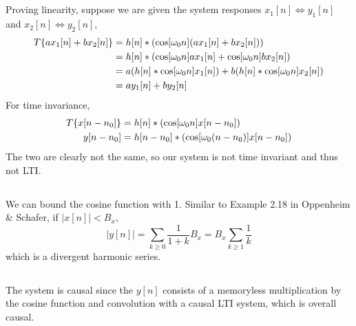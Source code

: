 \documentclass{article}
\begin{document}
\subsection{}
Proving linearity, suppose we are given the system responses \(x_1[n] \iff y_1[n]\) and \(x_2[n] \iff y_2[n]\),
\begin{align}
    T\{ax_1[n] + bx_2[n]\} &= h[n] \ast (\cosine[\omega_0 n] (ax_1[n] + bx_2[n])) \\
    &= h[n] \ast (\cos[\omega_0 n] ax_1[n] + \cos[\omega_0 n] bx_2[n]) \\
    &= a (h[n] \ast \cos[\omega_0 n] x_1[n]) + b (h[n] \ast \cos[\omega_0 n] x_2[n]) \\
    &= ay_1[n] + by_2[n]
\end{align}
For time invariance,
\begin{align}
    T\{x[n - n_0]\} &= h[n] \ast (\cosine[\omega_0 n] x[n - n_0]) \\
    y[n - n_0] &= h[n - n_0] \ast (\cosine[\omega_0 (n - n_0)] x[n - n_0])
\end{align}
The two are clearly not the same, so our system is not time invariant and thus not LTI.

\subsection{}

We can bound the cosine function with 1.
Similar to Example 2.18 in Oppenheim \& Schafer, if \(|x[n]| < B_x\),
\begin{equation}
    |y[n]| = \sum_{k \geqslant 0} \frac{1}{1 + k} B_x = B_x \sum_{k \geqslant 1} \frac{1}{k}
\end{equation}
which is a divergent harmonic series.

\subsection{}

The system is causal since the \(y[n]\) consists of a memoryless multiplication by the cosine function and convolution with a causal LTI system, which is overall causal.

\newpage
\section{}

\subsection{}
\end{document}
